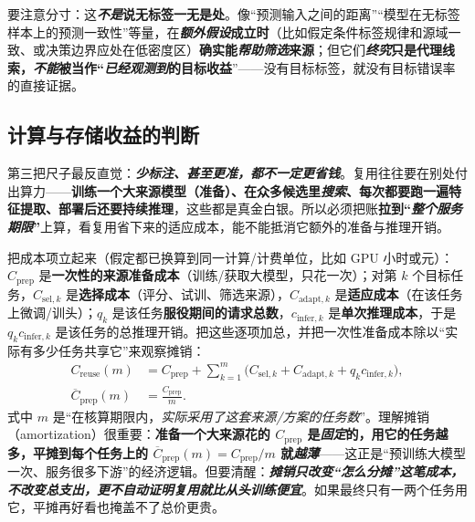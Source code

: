 要注意分寸：这\textbf{\emph{不是}说无标签一无是处}。像“预测输入之间的距离”“模型在无标签样本上的预测一致性”等量，在\textbf{\emph{额外假设}成立时}（比如假定条件标签规律和源域一致、或决策边界应处在低密度区）\textbf{确实能\emph{帮助筛选}来源}；但它们\textbf{\emph{终究}只是代理线索，\emph{不能}被当作“\emph{已经观测到}的目标收益}”——没有目标标签，就没有目标错误率的直接证据。

\subsection{计算与存储收益的判断}
\label{sec:ket-reuse-resource-benefits}

第三把尺子最反直觉：\textbf{\emph{少标注、甚至更准，都\emph{不一定}更省钱}}。复用往往要在别处付出算力——\textbf{训练一个大来源模型（准备）、在众多候选里\emph{搜索}、每次都要跑一遍特征提取、部署后还要持续推理}，这些都是真金白银。所以必须把账\textbf{拉到“\emph{整个服务期限}”}上算，看复用省下来的适应成本，能不能抵消它额外的准备与推理开销。

把成本项立起来（假定都已换算到同一计算/计费单位，比如 GPU 小时或元）：$C_{\mathrm{prep}}$ 是\textbf{一次性的来源准备成本}（训练/获取大模型，只花一次）；对第 $k$ 个目标任务，$C_{\mathrm{sel},k}$ 是\textbf{选择成本}（评分、试训、筛选来源），$C_{\mathrm{adapt},k}$ 是\textbf{适应成本}（在该任务上微调/训头）；$q_k$ 是该任务\textbf{服役期间的请求总数}，$c_{\mathrm{infer},k}$ 是\textbf{单次推理成本}，于是 $q_kc_{\mathrm{infer},k}$ 是该任务的总推理开销。把这些逐项加总，并把一次性准备成本除以“实际有多少任务共享它”来观察摊销：
\begin{equation}
  \begin{aligned}
    C_{\mathrm{reuse}}(m)
    &=C_{\mathrm{prep}}+
      \sum_{k=1}^{m}
      \bigl(C_{\mathrm{sel},k}+C_{\mathrm{adapt},k}
      +q_kc_{\mathrm{infer},k}\bigr),\\
    \overline C_{\mathrm{prep}}(m)&=\frac{C_{\mathrm{prep}}}{m}.
  \end{aligned}
  \label{eq:ket-reuse-amortization}
\end{equation}
式中 $m$ 是“在核算期限内，\emph{实际采用了这套来源/方案的任务数}”。理解摊销（amortization）很重要：\textbf{准备一个大来源花的 $C_{\mathrm{prep}}$ 是\emph{固定}的，用它的任务越多，平摊到每个任务上的 $\overline C_{\mathrm{prep}}(m)=C_{\mathrm{prep}}/m$ 就\emph{越薄}}——这正是“预训练大模型一次、服务很多下游”的经济逻辑。但要清醒：\textbf{\emph{摊销只改变“\emph{怎么分摊}”这笔成本，\emph{不改变}总支出，更\emph{不自动证明}复用就比从头训练便宜}}。如果最终只有一两个任务用它，平摊再好看也掩盖不了总价更贵。

